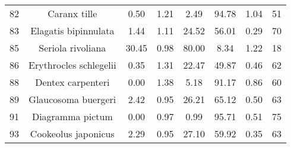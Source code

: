 \documentclass{report}\usepackage[]{graphicx}\usepackage[]{color}
\begin{document}
\begin{table}[ht]
{\begin{tabular}{cccccccc}
   82 & Caranx tille & 0.50 & 1.21 & 2.49 & 94.78 & 1.04 & 51 \\ 
   83 & Elagatis bipinnulata & 1.44 & 1.11 & 24.52 & 56.01 & 0.29 & 70 \\ 
   85 & Seriola rivoliana & 30.45 & 0.98 & 80.00 & 8.34 & 1.22 & 18 \\ 
   86 & Erythrocles schlegelii & 0.35 & 1.31 & 22.47 & 49.87 & 0.46 & 62 \\ 
   88 & Dentex carpenteri & 0.00 & 1.38 & 5.18 & 91.17 & 0.86 & 60 \\ 
   89 & Glaucosoma buergeri & 2.42 & 0.95 & 26.21 & 65.12 & 0.50 & 63 \\ 
   91 & Diagramma pictum & 0.00 & 0.97 & 0.99 & 95.71 & 0.51 & 75 \\ 
   93 & Cookeolus japonicus & 2.29 & 0.95 & 27.10 & 59.92 & 0.35 & 63 \\ 
   \hline
\end{tabular}
}
\end{table}

\clearpage
\newpage
\end{document}
